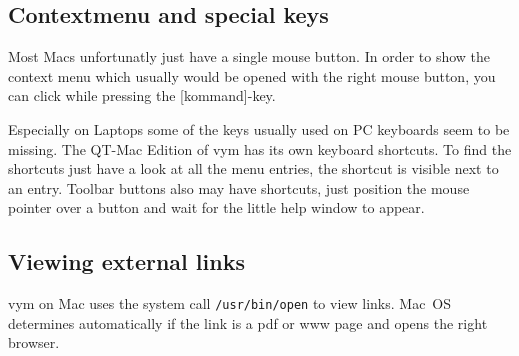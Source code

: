 \documentclass[12pt,a4paper]{article}
\newcommand{\vym}{{\sc vym }}
\newcommand{\key}[1]{[#1]}
\begin{document}
\subsection {Contextmenu and special keys}
Most Macs unfortunatly just have a single mouse button. In order to show
the context menu which usually would be opened with the right mouse
button, you can click while pressing the \key{kommand}-key.

Especially on Laptops some of the keys usually used on PC keyboards seem
to be missing. The QT-Mac Edition of \vym has its own keyboard
shortcuts. To find the shortcuts just have a look at all the menu
entries, the shortcut is visible next to an entry. Toolbar buttons also
may have shortcuts, just position the mouse pointer over a button and
wait for the little help window to appear. 

\subsection {Viewing external links}
\vym on Mac uses the system call {\tt /usr/bin/open} to view links.
Mac~OS determines automatically if the link is a pdf or www page and
opens the right browser.


\newpage
\end{document}
